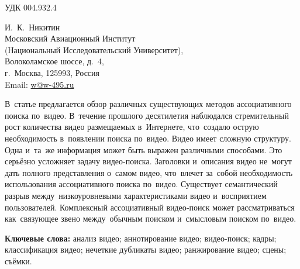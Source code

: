 

\noindent УДК 004.932.4


\begin{flushright}
\sf\small
И.~К.~Никитин \\
Московский Авиационный Институт \\
(Национальный Исследовательский Университет), \\
Волоколамское шоссе, д.~4, \\
г.~Москва, 125993, Россия \\
Email: \href{mailto: w@w-495.ru}{w@w-495.ru}
\end{flushright}




В~статье предлагается обзор различных существующих методов
ассоциативного поиска по~видео.
В~течение прошлого десятилетия наблюдался стремительный рост
количества видео размещаемых в~Интернете,
что~создало острую необходимость в~появлении поиска по~видео.
Видео имеет сложную структуру. Одна и~та~же информация
может быть выражен различными способами.
Это серьёзно усложняет задачу видео-поиска.
Заголовки и~описания видео не~могут
дать полного представления о~самом видео,
что~влечет за~собой необходимость использования
ассоциативного поиска по~видео.
Существует семантический разрыв между~низкоуровневыми
характеристиками видео и~восприятием пользователей.
Комплексный ассоциативный видео‑поиск
может рассматриваться как~связующее звено между~обычным поиском
и~смысловым поиском по~видео.

{\bf Ключевые слова:}
анализ видео;
аннотирование видео;
видео-поиск;
кадры;
классификация видео;
нечеткие дубликаты видео;
ранжирование видео;
сцены;
съёмки.


